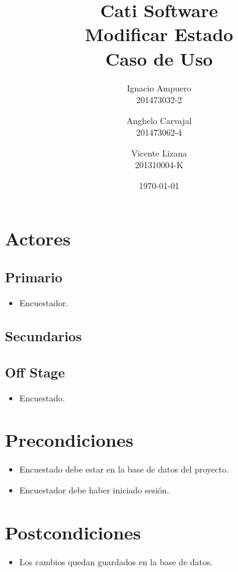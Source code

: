 \documentclass[fleqn]{article}
\title{\huge Cati Software\\ \Huge Modificar Estado\\ \Large Caso de Uso \vspace{30pt}}
\author{Ignacio Ampuero\\ 201473032-2 \and Anghelo Carvajal\\ 201473062-4 \and Vicente Lizana\\ 201310004-K}
\date{\today}
\begin{document}
\maketitle
\vspace{30pt}

\section{Actores}

	\subsection{Primario}
	
	\begin{itemize}
		\item Encuestador.
	\end{itemize}		
	
	\subsection{Secundarios}
	
	\subsection{Off Stage}
	
	\begin{itemize}
		\item Encuestado.
	\end{itemize}

\section{Precondiciones}

\begin{itemize}
	\item Encuestado debe estar en la base de datos del proyecto.
	\item Encuestador debe haber iniciado sesión.
\end{itemize}

\section{Postcondiciones}

\begin{itemize}
	\item Los cambios quedan guardados en la base de datos.
\end{itemize}
\end{document}
